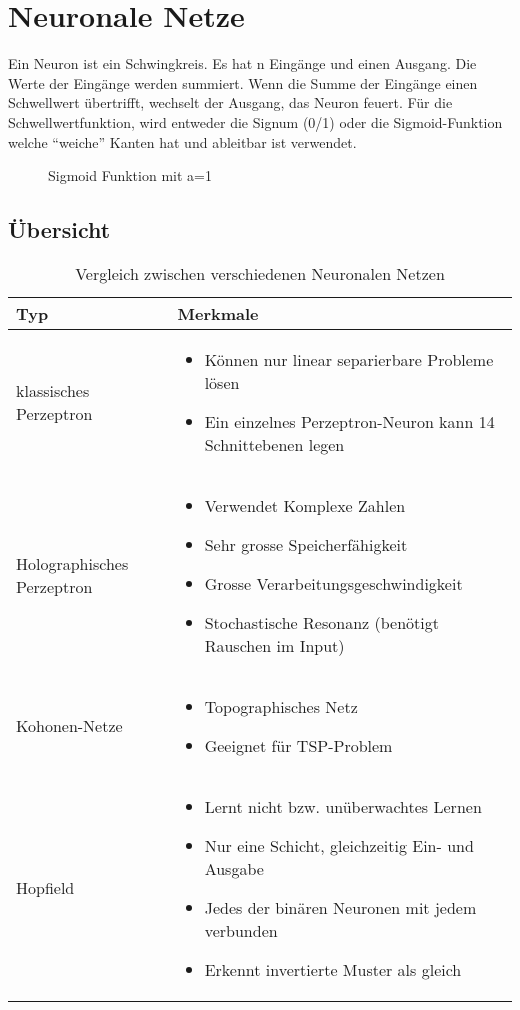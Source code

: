 \section{Neuronale Netze}
Ein Neuron ist ein Schwingkreis. Es hat n Eingänge und einen Ausgang. Die Werte der
Eingänge werden summiert. Wenn die Summe der Eingänge einen Schwellwert übertrifft, wechselt der Ausgang, das Neuron feuert.
Für die Schwellwertfunktion, wird entweder die Signum (0/1) oder die Sigmoid-Funktion welche ``weiche'' Kanten hat und ableitbar ist verwendet.
\begin{figure}[htb]
	\centering
	
	\caption{Sigmoid Funktion mit a=1}
\end{figure}
\newpage
\subsection{Übersicht}
\begin{table}[htbp]
	\centering
	\begin{tabular}{l | p{8cm}}
		Typ & Merkmale \\
		\hline
		{klassisches Perzeptron} & {
			\begin{itemize}
				\item Können nur linear separierbare Probleme lösen
				\item Ein einzelnes Perzeptron-Neuron kann 14 Schnittebenen legen
			\end{itemize}
		}
		\\
		{Holographisches Perzeptron} & {
			\begin{itemize}
				\item Verwendet Komplexe Zahlen
				\item Sehr grosse Speicherfähigkeit
				\item Grosse Verarbeitungsgeschwindigkeit
				\item Stochastische Resonanz (benötigt Rauschen im Input)
			\end{itemize}
		}
		\\
		{Kohonen-Netze} & {
			\begin{itemize}
				\item Topographisches Netz
				\item Geeignet für TSP-Problem
			\end{itemize}
		}
		\\
		{Hopfield} & {
			\begin{itemize}
				\item Lernt nicht bzw. unüberwachtes Lernen
				\item Nur eine Schicht, gleichzeitig Ein- und Ausgabe
				\item Jedes der binären Neuronen mit jedem verbunden
				\item Erkennt invertierte Muster als gleich
			\end{itemize}
		}
	\end{tabular}
	\caption{Vergleich zwischen verschiedenen Neuronalen Netzen}
	\label{tab:nnetze}
\end{table}
